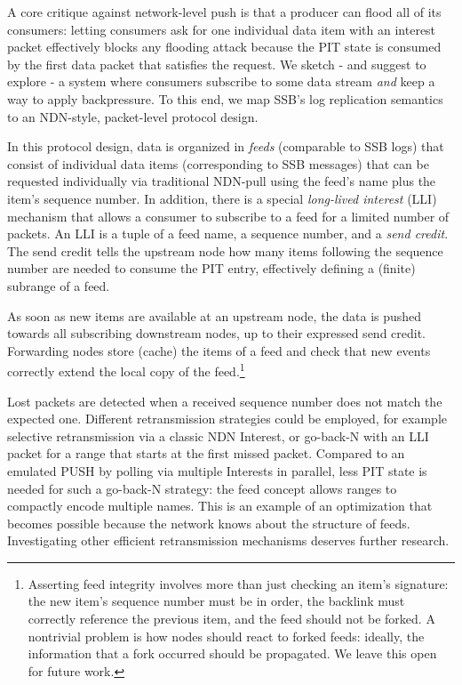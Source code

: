 \documentclass[9pt,sigconf]{acmart}
\begin{document}
A core critique against network-level push is that a producer can
flood all of its consumers: letting consumers ask for one individual
data item with an interest packet effectively blocks any flooding
attack because the PIT state is consumed by the first data packet that
satisfies the request. We sketch - and suggest to explore - a system
where consumers subscribe to some data stream {\em and} keep a way to
apply backpressure. To this end, we map SSB's log replication
semantics to an NDN-style, packet-level protocol design.

In this protocol design, data is organized in \textit{feeds}
(comparable to SSB logs) that consist of individual data items
(corresponding to SSB messages) that can be requested individually via
traditional NDN-pull using the feed's name plus the item's sequence
number.  In addition, there is a special \textit{long-lived interest}
(LLI) mechanism that allows a consumer to subscribe to a feed for a
limited number of packets. An LLI is a tuple of a feed name, a
sequence number, and a \textit{send credit}.  The send credit tells
the upstream node how many items following the sequence number are
needed to consume the PIT entry, effectively defining a (finite)
subrange of a feed.

As soon as new items are available at an upstream node, the data is
pushed towards all subscribing downstream nodes, up to their expressed
send credit. Forwarding nodes store (cache) the items of a feed and
check that new events correctly extend the local copy of the
feed.\footnote{ Asserting feed integrity involves more than just
  checking an item's signature: the new item's sequence number must be
  in order, the backlink must correctly reference the previous item,
  and the feed should not be forked. A nontrivial problem is how nodes
  should react to forked feeds: ideally, the information that a fork
  occurred should be propagated. We leave this open for future work.}

Lost packets are detected when a received sequence number does not
match the expected one. Different retransmission strategies could be
employed, for example selective retransmission via a classic NDN
Interest, or go-back-N with an LLI packet for a range that starts at
the first missed packet. Compared to an emulated PUSH by polling via
multiple Interests in parallel, less PIT state is needed for such a
go-back-N strategy: the feed concept allows ranges to compactly encode
multiple names. This is an example of an optimization that becomes
possible because the network knows about the structure of
feeds. Investigating other efficient retransmission mechanisms
deserves further research.
\end{document}
